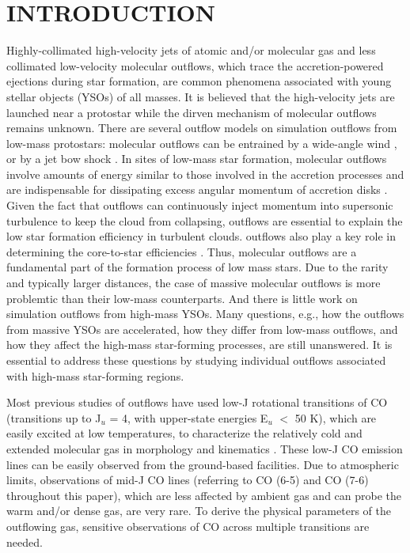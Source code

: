 \section{INTRODUCTION}
Highly-collimated high-velocity jets of atomic and/or molecular gas and less collimated low-velocity molecular outflows, which trace the accretion-powered ejections during star formation, are common phenomena associated with young stellar objects (YSOs) of all masses\citep{ 1985ARA&A..23..267L,1993prpl.conf..603F, 2001ApJ...552L.167Z,2002A&A...383..892B, 2004A&A...426..503W, 2006A&A...453..785F, 2007prpl.conf..245A, 2015MNRAS.453..645M}. It is believed that the high-velocity jets are launched near a protostar while the dirven mechanism of molecular outflows remains unknown. There are several outflow models on simulation outflows from low-mass protostars: molecular outflows can be entrained by a wide-angle wind \citep{1991ApJ...370L..31S,1996ApJ...472..211L, 2001ApJ...557..429L}, or by a jet bow shock \citep{ 1993A&A...278..267R, 1993ApJ...414..230M, 2001ApJ...557..429L}. In sites of low-mass star formation, molecular outflows involve amounts of energy similar to those involved in the accretion processes and are indispensable for dissipating excess angular momentum of accretion disks \citep{1987ARA&A..25...23S, 1996ARA&A..34..111B}. Given the fact that outflows can continuously inject momentum into supersonic turbulence to keep the cloud from collapsing, outflows are essential to explain the low star formation efficiency in turbulent clouds. outflows also play a key role in determining the core-to-star efficiencies \citep{2014prpl.conf..451F}. Thus, molecular outflows are a fundamental part of the formation process of low mass stars. Due to the rarity and typically larger distances, the case of massive molecular outflows is more problemtic than their low-mass counterparts. And there is little work on simulation outflows from high-mass YSOs. Many questions, e.g., how the outflows from massive YSOs are accelerated, how they differ from low-mass outflows, and how they affect the high-mass star-forming processes, are still unanswered. It is essential to address these questions by studying individual outflows associated with high-mass star-forming regions. 

Most previous studies of outflows have used low-J rotational transitions of CO (transitions up to J$_u$ = 4, with upper-state energies E$_u$ $<$ 50 K), which are easily excited at low temperatures, to characterize the relatively cold and extended molecular gas in morphology and kinematics \citep{1998ApJ...507..861S, 2004ApJ...604..258S, 2008ApJ...675..454Y, 2009ApJ...696...66Q, 2009A&A...495..169S, 2013ApJ...774...39A, 2016ApJ...832..158Z}. These low-J CO emission lines can be easily observed from the ground-based facilities. Due to atmospheric limits, observations of mid-J CO lines (referring to CO (6-5) and CO (7-6) throughout this paper), which are less affected by ambient gas and can probe the warm and/or dense gas, are very rare. To derive the physical parameters of the outflowing gas, sensitive observations of CO across multiple transitions are needed. 

